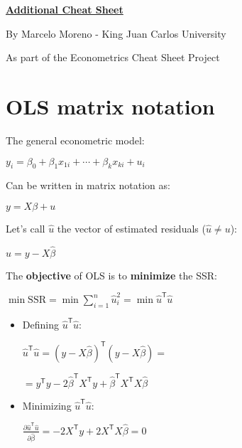 \documentclass[10pt, a4paper, landscape]{extarticle}
\newcommand{\SSR}{\mathrm{SSR}}
\newcommand{\tr}{\mathsf{T}}
\begin{document}
\setlength{\footskip}{12pt}

\begin{multicols}{3}

\begin{center}
	\textbf{\LARGE \href{https://github.com/marcelomijas/econometrics-cheatsheet}{Additional Cheat Sheet}}
	
	{\footnotesize By Marcelo Moreno - King Juan Carlos University}
	
	{\footnotesize As part of the Econometrics Cheat Sheet Project}
\end{center}

\section*{OLS matrix notation}

The general econometric model:

\begin{center}
	$y_i = \beta_0 + \beta_1 x_{1i} + \cdots + \beta_k x_{ki} + u_i$
\end{center}

Can be written in matrix notation as:

\begin{center}
	$y = X \beta + u$
\end{center}

Let's call $\hat{u}$ the vector of estimated residuals ($\hat{u} \neq u$):

\begin{center}
	$\hat{u} = y - X \hat{\beta}$
\end{center}

The \textbf{objective} of OLS is to \textbf{minimize} the SSR:

\begin{center}
	$\min \SSR = \min \sum_{i=1}^n \hat{u}_i^2 = \min \hat{u}^\tr \hat{u}$
\end{center}

\begin{itemize}[leftmargin=*]
	\item Defining $\hat{u}^\tr \hat{u}$:
	\begin{center}
		$\hat{u}^\tr \hat{u} = (y - X \hat{\beta})^\tr (y - X \hat{\beta}) =$

		$= y^\tr y -2 \hat{\beta}^\tr X^\tr y + \hat{\beta}^\tr X^\tr X \hat{\beta}$
	\end{center}
	\item Minimizing $\hat{u}^\tr \hat{u}$:
	\begin{center}
		$\frac{\partial \hat{u}^\tr \hat{u}}{\partial \hat{\beta}} = -2 X^\tr y + 2 X^\tr X \hat{\beta} = 0$


\end{center}
\end{itemize}
\end{multicols}
\end{document}
